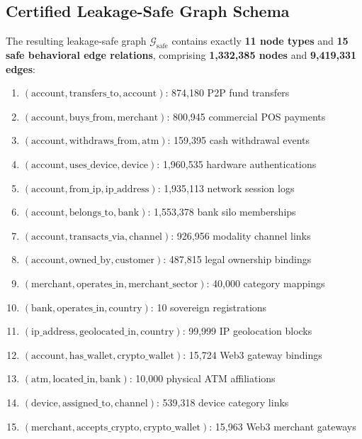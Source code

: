 \documentclass[conference]{IEEEtran}
\begin{document}
\subsection{Certified Leakage-Safe Graph Schema}
The resulting leakage-safe graph $\mathcal{G}_{\text{safe}}$ contains exactly \textbf{11 node types} and \textbf{15 safe behavioral edge relations}, comprising \textbf{1,332,385 nodes} and \textbf{9,419,331 edges}:
\begin{enumerate}
    \item $(\text{account}, \text{transfers\_to}, \text{account})$: 874,180 P2P fund transfers
    \item $(\text{account}, \text{buys\_from}, \text{merchant})$: 800,945 commercial POS payments
    \item $(\text{account}, \text{withdraws\_from}, \text{atm})$: 159,395 cash withdrawal events
    \item $(\text{account}, \text{uses\_device}, \text{device})$: 1,960,535 hardware authentications
    \item $(\text{account}, \text{from\_ip}, \text{ip\_address})$: 1,935,113 network session logs
    \item $(\text{account}, \text{belongs\_to}, \text{bank})$: 1,553,378 bank silo memberships
    \item $(\text{account}, \text{transacts\_via}, \text{channel})$: 926,956 modality channel links
    \item $(\text{account}, \text{owned\_by}, \text{customer})$: 487,815 legal ownership bindings
    \item $(\text{merchant}, \text{operates\_in}, \text{merchant\_sector})$: 40,000 category mappings
    \item $(\text{bank}, \text{operates\_in}, \text{country})$: 10 sovereign registrations
    \item $(\text{ip\_address}, \text{geolocated\_in}, \text{country})$: 99,999 IP geolocation blocks
    \item $(\text{account}, \text{has\_wallet}, \text{crypto\_wallet})$: 15,724 Web3 gateway bindings
    \item $(\text{atm}, \text{located\_in}, \text{bank})$: 10,000 physical ATM affiliations
    \item $(\text{device}, \text{assigned\_to}, \text{channel})$: 539,318 device category links
    \item $(\text{merchant}, \text{accepts\_crypto}, \text{crypto\_wallet})$: 15,963 Web3 merchant gateways
\end{enumerate}
\end{document}
